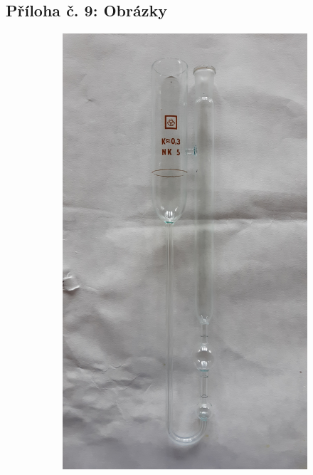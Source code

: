 \documentclass[12pt]{article}
\begin{document}
\newpage
\subsection*{Příloha č. 9: Obrázky}
\begin{figure}[h!]
    \begin{subfigure}[b]{.5\textwidth}
        \includegraphics[angle = 270, width = \textwidth]{prilohy/muj_ostwald1.jpg}
    \end{subfigure}
    \hfill
    \begin{subfigure}[b]{.5\textwidth}

\end{subfigure}
\end{figure}
\end{document}
